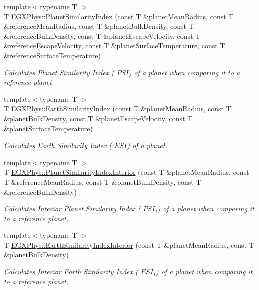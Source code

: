 \begin{DoxyCompactItemize}
{\footnotesize template$<$typename T $>$ }\\T \hyperlink{group___astrophysics_ga62e8b781c301df60bd04af3183a965eb}{E\+G\+X\+Phys\+::\+Planet\+Similarity\+Index} (const T \&planet\+Mean\+Radius, const T \&reference\+Mean\+Radius, const T \&planet\+Bulk\+Density, const T \&reference\+Bulk\+Density, const T \&planet\+Escape\+Velocity, const T \&reference\+Escape\+Velocity, const T \&planet\+Surface\+Temperature, const T \&reference\+Surface\+Temperature)
\begin{DoxyCompactList}\small\item\em Calculates Planet Similarity Index ( $PSI$) of a planet when comparing it to a reference planet. \end{DoxyCompactList}\item 
{\footnotesize template$<$typename T $>$ }\\T \hyperlink{group___astrophysics_ga4b86397b1c839c49ac599d49fda207d4}{E\+G\+X\+Phys\+::\+Earth\+Similarity\+Index} (const T \&planet\+Mean\+Radius, const T \&planet\+Bulk\+Density, const T \&planet\+Escape\+Velocity, const T \&planet\+Surface\+Temperature)
\begin{DoxyCompactList}\small\item\em Calculates Earth Similarity Index ( $ESI$) of a planet. \end{DoxyCompactList}\item 
{\footnotesize template$<$typename T $>$ }\\T \hyperlink{group___astrophysics_ga6dc06a1a8baf6e132abed51fcf410c7f}{E\+G\+X\+Phys\+::\+Planet\+Similarity\+Index\+Interior} (const T \&planet\+Mean\+Radius, const T \&reference\+Mean\+Radius, const T \&planet\+Bulk\+Density, const T \&reference\+Bulk\+Density)
\begin{DoxyCompactList}\small\item\em Calculates Interior Planet Similarity Index ( $PSI_I$) of a planet when comparing it to a reference planet. \end{DoxyCompactList}\item 
{\footnotesize template$<$typename T $>$ }\\T \hyperlink{group___astrophysics_ga699bcc2f17b8855eaa856595d8032f61}{E\+G\+X\+Phys\+::\+Earth\+Similarity\+Index\+Interior} (const T \&planet\+Mean\+Radius, const T \&planet\+Bulk\+Density)
\begin{DoxyCompactList}\small\item\em Calculates Interior Earth Similarity Index ( $ESI_I$) of a planet when comparing it to a reference planet. \end{DoxyCompactList}\item 

\end{DoxyCompactItemize}
